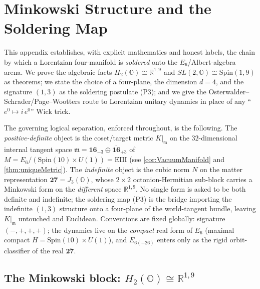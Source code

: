 \documentclass[11pt]{article}
\theoremstyle{plain}
\theoremstyle{definition}
\theoremstyle{remark}
\begin{document}
\section{Minkowski Structure and the Soldering Map}
\label{sec:app-lorentz:main}
\label{sec:app-soldering:main}

This appendix establishes, with explicit mathematics and honest labels, the chain
by which a Lorentzian four-manifold is \emph{soldered} onto the
$E_{6}$/Albert-algebra arena. We prove the algebraic facts
$H_{2}(\mathbb{O})\cong\mathbb{R}^{1,9}$ and $SL(2,\mathbb{O})\cong\mathrm{Spin}(1,9)$
as theorems; we state the choice of a four-plane, the dimension $d=4$, and the
signature $(1,3)$ as the soldering postulate (P3); and we give the
Osterwalder--Schrader/Page--Wootters route to Lorentzian unitary dynamics in place
of any ``$e^{0}\mapsto i\,e^{0}$'' Wick trick.

The governing logical separation, enforced throughout, is the following. The
\emph{positive-definite} object is the coset/target metric $K|_{\mathfrak{m}}$ on
the $32$-dimensional internal tangent space
$\mathfrak{m}=\mathbf{16}_{-3}\oplus\overline{\mathbf{16}}_{+3}$ of
$M=E_{6}/(\mathrm{Spin}(10)\times U(1))=\mathrm{EIII}$ (see
\autoref{cor:VacuumManifold} and \autoref{thm:uniqueMetric}). The \emph{indefinite}
object is the cubic norm $N$ on the matter representation $\mathbf{27}=J_{3}(\mathbb{O})$,
whose $2\times2$ octonion-Hermitian sub-block carries a Minkowski form on the
\emph{different} space $\mathbb{R}^{1,9}$. No single form is asked to be both
definite and indefinite; the soldering map (P3) is the bridge importing the
indefinite $(1,3)$ structure onto a four-plane of the world-tangent bundle, leaving
$K|_{\mathfrak{m}}$ untouched and Euclidean. Conventions are fixed globally:
signature $(-,+,+,+)$; the dynamics live on the \emph{compact} real form of $E_{6}$
(maximal compact $H=\mathrm{Spin}(10)\times U(1)$), and $E_{6(-26)}$ enters only as
the rigid orbit-classifier of the real $\mathbf{27}$.

\subsection{The Minkowski block: \texorpdfstring{$H_{2}(\mathbb{O})\cong\mathbb{R}^{1,9}$}{H2(O) = R(1,9)}}
\label{subsec:app-lorentz:h2o}
\end{document}
